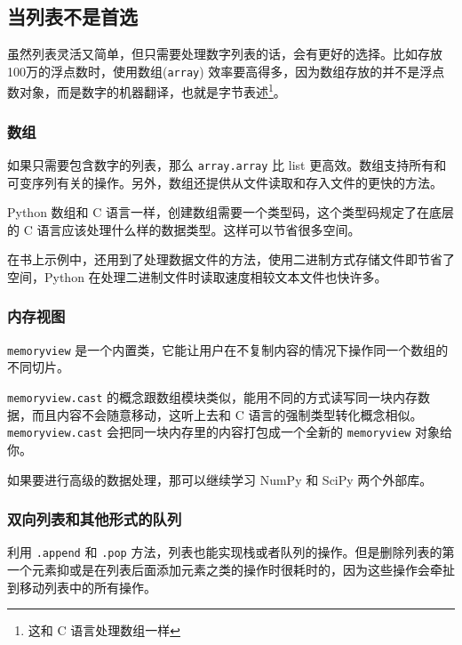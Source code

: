 \subsection{当列表不是首选}

虽然列表灵活又简单，但只需要处理数字列表的话，会有更好的选择。比如存放 100万的浮点数时，使用数组(\texttt{array}) 效率要高得多，因为数组存放的并不是浮点数对象，而是数字的机器翻译，也就是字节表述\footnote{这和 C 语言处理数组一样}。

\subsubsection{数组}

如果只需要包含数字的列表，那么 \texttt{array.array} 比 list 更高效。数组支持所有和可变序列有关的操作。另外，数组还提供从文件读取和存入文件的更快的方法。

Python 数组和 C 语言一样，创建数组需要一个类型码，这个类型码规定了在底层的 C 语言应该处理什么样的数据类型。这样可以节省很多空间。



在书上示例中，还用到了处理数据文件的方法，使用二进制方式存储文件即节省了空间，Python 在处理二进制文件时读取速度相较文本文件也快许多。

\subsubsection{内存视图}

\texttt{memoryview} 是一个内置类，它能让用户在不复制内容的情况下操作同一个数组的不同切片。

\texttt{memoryview.cast} 的概念跟数组模块类似，能用不同的方式读写同一块内存数据，而且内容不会随意移动，这听上去和 C 语言的强制类型转化概念相似。\texttt{memoryview.cast} 会把同一块内存里的内容打包成一个全新的  \texttt{memoryview} 对象给你。



如果要进行高级的数据处理，那可以继续学习 NumPy 和 SciPy 两个外部库。

\subsubsection{双向列表和其他形式的队列}

利用 \texttt{.append} 和 \texttt{.pop} 方法，列表也能实现栈或者队列的操作。但是删除列表的第一个元素抑或是在列表后面添加元素之类的操作时很耗时的，因为这些操作会牵扯到移动列表中的所有操作。


